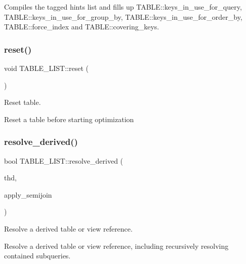 Compiles the tagged hints list and fills up T\+A\+B\+L\+E\+::keys\+\_\+in\+\_\+use\+\_\+for\+\_\+query, T\+A\+B\+L\+E\+::keys\+\_\+in\+\_\+use\+\_\+for\+\_\+group\+\_\+by, T\+A\+B\+L\+E\+::keys\+\_\+in\+\_\+use\+\_\+for\+\_\+order\+\_\+by, T\+A\+B\+L\+E\+::force\+\_\+index and T\+A\+B\+L\+E\+::covering\+\_\+keys. \mbox{\label{structTABLE__LIST_a42d66db36c7b7244497c177597e5f9ef}} 
\subsubsection{\texorpdfstring{reset()}{reset()}}
{\footnotesize\ttfamily void T\+A\+B\+L\+E\+\_\+\+L\+I\+S\+T\+::reset (\begin{DoxyParamCaption}\item[{void}]{ }\end{DoxyParamCaption})}



Reset table. 

Reset a table before starting optimization \mbox{\label{structTABLE__LIST_a9e0d3b6d173c9e31b84a6b4165f078ab}} 
\subsubsection{\texorpdfstring{resolve\+\_\+derived()}{resolve\_derived()}}
{\footnotesize\ttfamily bool T\+A\+B\+L\+E\+\_\+\+L\+I\+S\+T\+::resolve\+\_\+derived (\begin{DoxyParamCaption}\item[{T\+HD $\ast$}]{thd,  }\item[{bool}]{apply\+\_\+semijoin }\end{DoxyParamCaption})}



Resolve a derived table or view reference. 

Resolve a derived table or view reference, including recursively resolving contained subqueries.


